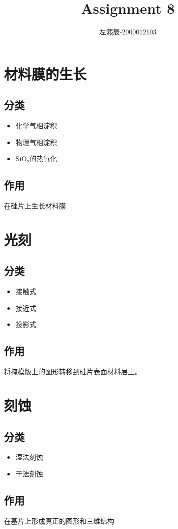 \documentclass[utf8]{ctexart}
\title{Assignment 8}
\author{左熙辰-2000012103}
\date{}
\begin{document}
	\maketitle
	\section{材料膜的生长}
		\subsection{分类}
			\begin{itemize}
				\item{化学气相淀积}
				\item{物理气相淀积}
				\item{SiO$_{2}$的热氧化}
			\end{itemize}
		\subsection{作用}
			在硅片上生长材料膜
	\section{光刻}
		\subsection{分类}
			\begin{itemize}
				\item{接触式}
				\item{接近式}
				\item{投影式}
			\end{itemize}
		\subsection{作用}
		将掩模版上的图形转移到硅片表面材料层上。
	\section{刻蚀}
		\subsection{分类}
			\begin{itemize}
				\item{湿法刻蚀}
				\item{干法刻蚀}
			\end{itemize}
		\subsection{作用}	
		在基片上形成真正的图形和三维结构
\end{document}
